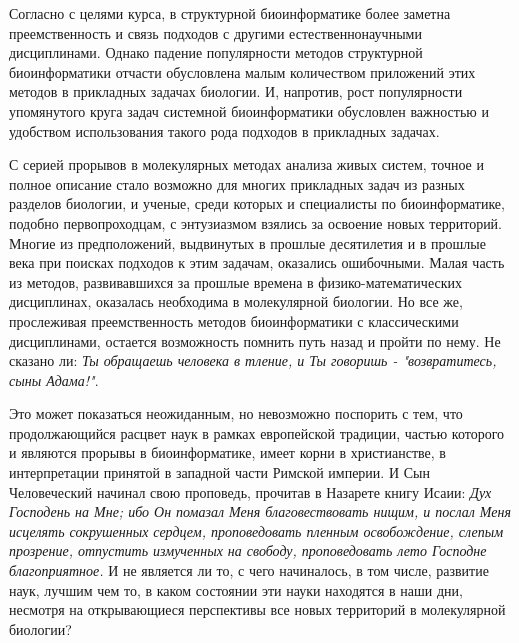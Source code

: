 \documentclass[a4paper,12pt,oneside,openany]{memoir}
\begin{document}
Согласно с целями курса, в структурной биоинформатике более заметна преемственность и связь подходов с другими естественнонаучными дисциплинами. Однако падение популярности методов структурной биоинформатики отчасти обусловлена малым количеством приложений этих методов в прикладных задачах биологии. И, напротив, рост популярности упомянутого круга задач системной биоинформатики обусловлен важностью и удобством использования такого рода подходов в прикладных задачах. 


С серией прорывов в молекулярных методах анализа живых систем, точное и полное описание стало возможно для многих прикладных задач из разных разделов биологии, и ученые, среди которых и специалисты по биоинформатике, подобно первопроходцам, с энтузиазмом взялись за освоение новых территорий. Многие из предположений, выдвинутых в прошлые десятилетия и в прошлые века при поисках подходов к этим задачам, оказались ошибочными. Малая часть из методов, развивавшихся за прошлые времена в физико-математических дисциплинах, оказалась необходима в молекулярной биологии. Но все же, прослеживая преемственность методов биоинформатики с классическими дисциплинами, остается возможность помнить путь назад и пройти по нему. Не сказано ли: {\emfont \itshape \small Ты обращаешь человека в тление, и Ты говоришь - "возвратитесь, сыны Адама!"}. 

Это может показаться неожиданным, но невозможно поспорить с тем, что продолжающийся расцвет наук в рамках европейской традиции, частью которого и являются прорывы в биоинформатике, имеет корни в христианстве, в интерпретации принятой в западной части Римской империи. И Сын Человеческий начинал свою проповедь, прочитав в Назарете книгу Исаии: {\emfont \itshape \small Дух Господень на Мне; ибо Он помазал Меня благовествовать нищим, и послал Меня исцелять сокрушенных сердцем, проповедовать пленным освобождение, слепым прозрение, отпустить измученных на свободу, проповедовать лето Господне благоприятное.} И не является ли то, с чего начиналось, в том числе, развитие наук, лучшим чем то, в каком состоянии эти науки находятся в наши дни, несмотря на открывающиеся перспективы все новых территорий в молекулярной биологии?









\end{document}

